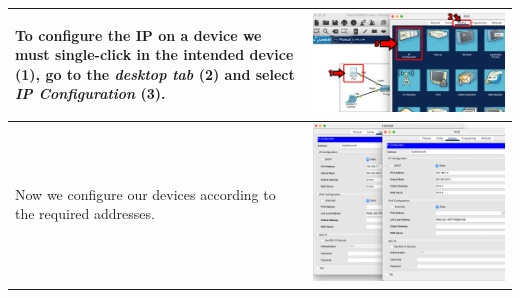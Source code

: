 \documentclass[11pt,a4paper]{report}
\begin{document}
\begin{flushleft}
\begin{center}
\begin{longtable}{ m{5cm} l }
                    To configure the IP on a device we must \textbf{single-click} in the intended device (1), go to the \textit{desktop tab} (2) and select \textit{IP Configuration} (3).                                                                                                      & \includegraphics[scale=0.35,valign=c]{p1-connectingdevices/CiscoPacketTracer_configIP} \\ \hline
                    Now we configure our devices according to the required addresses.                                                                                                                                                                                                           & \includegraphics[scale=0.34,valign=c]{p1-connectingdevices/Laptop0PC0_ip} \\ \hline

\end{longtable}
\end{center}
\end{flushleft}
\end{document}
